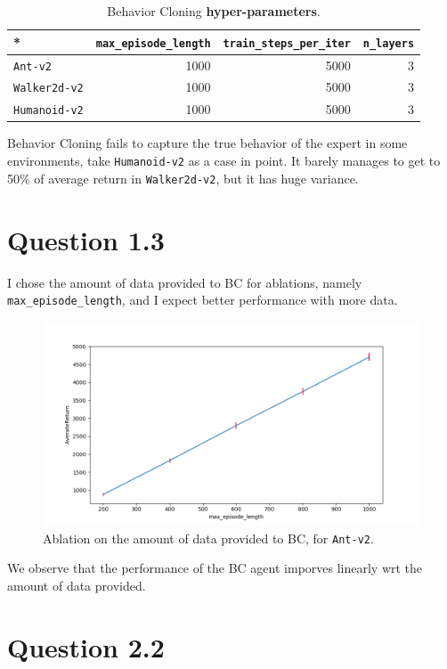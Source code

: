 \documentclass[11pt]{article}
\begin{document}
\begin{table}[htbp]
\caption[BC for \texttt{Ant-v2}]{Behavior Cloning \textbf{\textbf{hyper-parameters}}.}
\centering
\begin{tabular}{l|r|r|r}
* & \texttt{max\_episode\_length} & \texttt{train\_steps\_per\_iter} & \texttt{n\_layers}\\
\hline
\texttt{Ant-v2} & 1000 & 5000 & 3\\
\hline
\texttt{Walker2d-v2} & 1000 & 5000 & 3\\
\hline
\texttt{Humanoid-v2} & 1000 & 5000 & 3\\
\end{tabular}
\end{table}

Behavior Cloning fails to capture the true behavior of the expert in some environments, take \texttt{Humanoid-v2} as a case in point. It barely manages to get to 50\% of average return in \texttt{Walker2d-v2}, but it has huge variance.

\section{Question 1.3}
\label{sec:org5da89ee}
I chose the amount of data provided to BC for ablations, namely \texttt{max\_episode\_length}, and I expect better performance with more data.
\begin{figure}[htbp]
\centering
\includegraphics[width=.9\linewidth]{./Figure_1.png}
\caption{\label{Ablation}Ablation on the amount of data provided to BC, for \texttt{Ant-v2}.}
\end{figure}

We observe that the performance of the BC agent imporves linearly wrt the amount of data provided.

\clearpage
\section{Question 2.2}
\label{sec:org24f8b09}
\end{document}
